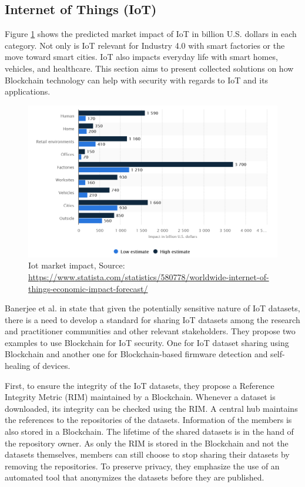 \subsection{Internet of Things (IoT)}
\label{subsec:03_IoT}

Figure \ref{fig:iot_market} shows the predicted market impact of IoT in billion U.S. dollars in each category.
Not only is IoT relevant for Industry 4.0 with smart factories or the move toward smart cities. IoT also
impacts everyday life with smart homes, vehicles, and healthcare. This section aims to present collected solutions on how  Blockchain technology can help with security with regards to IoT and its applications.


\begin{figure}[ht!]
  \begin{center}
    \includegraphics[scale=0.6]{Talk7/img/iot/iot_statista}
  \end{center}
  \caption{Iot market impact, Source: \protect\url{https://www.statista.com/statistics/580778/worldwide-internet-of-things-economic-impact-forecast/}~\cite{StatistaIoT} }
  \label{fig:iot_market}
\end{figure}

Banerjee et al. in \cite{Banerjee2018} state that given the potentially sensitive nature of IoT datasets,
there is a need to develop a standard for sharing IoT datasets among the research and practitioner communities
and other relevant stakeholders. They propose two examples to use Blockchain for IoT security. One for IoT dataset sharing using Blockchain and another one for
Blockchain-based firmware detection and self-healing of devices.

First, to ensure the integrity of the IoT datasets, they propose a Reference Integrity Metric (RIM) maintained by a Blockchain. Whenever a dataset is downloaded, its integrity can be checked using the RIM.
A central hub maintains the references to the repositories of the datasets. Information of the members is also stored in a Blockchain.
The lifetime of the shared datasets is in the hand of the repository owner.
As only the RIM is stored in the Blockchain and not the datasets themselves, members can still choose to stop sharing their datasets by removing the repositories.
To preserve privacy, they emphasize the use of an automated tool that anonymizes the datasets before they are published.


